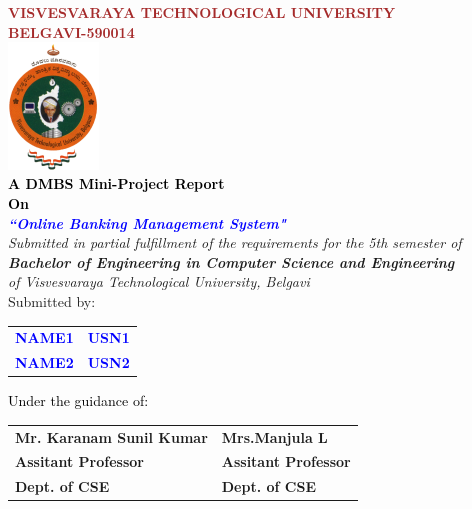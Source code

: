 
\begin{titlepage}
\begin{center}
\break\break
\textup{\large {\textcolor{brown}{\bf VISVESVARAYA TECHNOLOGICAL UNIVERSITY} \\ {\textcolor{brown}{\bf BELGAVI-590014}}}}\\[0.1in]
\includegraphics[width=0.18\textwidth]{./VTU.png}\\[0.1in]
\textup{\small {\textcolor{black}{\textbf {A DMBS Mini-Project Report} \\ {\textbf {On}}}}} \\[0.2in]
\textup{\large {\textcolor{blue}{\textbf {\textit {``Online Banking Management System"}}}}} \\[0.2in]
\textup{{\textit {Submitted in partial fulfillment of the requirements for the 5th semester of} \\ {\textbf {\textit {Bachelor of Engineering in Computer Science and Engineering}} \\ \textit {of Visvesvaraya Technological University, Belgavi}}}}\\[0.15in]
\textup{Submitted by:} 
\break\break
\begin{tabular}{l  l}
\textcolor{blue}{\textbf{NAME1}} & \textcolor{blue}{\hspace{2.7cm}\textbf{USN1}}\\[0.3in]
\textcolor{blue}{\textbf{NAME2}} & \textcolor{blue}{\hspace{2.7cm}\textbf{USN2}}\\
\end{tabular}
\break\break\break\break
\textup{\normalsize {\textcolor{black}{ Under the guidance of:}}}\break\break
\begin{tabular}{l  l}
\textbf{Mr. Karanam Sunil Kumar} & \hspace{2.7cm}\textbf{Mrs.Manjula L}\\
\textbf{Assitant Professor} & \hspace{2.7cm}\textbf{Assitant Professor}\\
\textbf{Dept. of CSE} & \hspace{2.7cm}\textbf{Dept. of CSE}\\
\end{tabular}


\end{center}
\end{titlepage}
